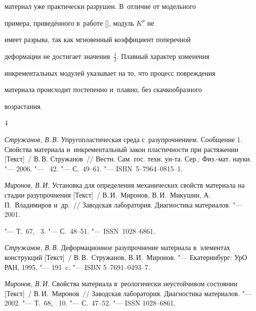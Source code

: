 материал уже практически разрушен. В~отличие от модельного

примера, приведённого в~работе [], модуль $K^{p}$ не

имеет разрыва, так как мгновенный коэффициент поперечной

деформации не достигает значения~$\frac12$. Плавный характер изменения

инкрементальных модулей указывает на то, что процесс повреждения

материала происходит постепенно и~плавно, без скачкообразного

возрастания.





\begin{thebibliography}{4}




\emph{Стружанов, В.\,В.} Упругопластическая среда с~разупрочнением. Сообщение 1. Свойства материала и~инкрементальный закон пластичности при растяжении [Текст]~/ В.\,В. Стружанов~/\!/ Вестн. Сам. гос. техн. ун-та. Сер.: Физ.-мат. науки. "--- 2006. "--- \No~42. "--- С.~49--61. "--- ISBN~5--7964--0815--1.




\emph{Миронов, В.\,И.} Установка для определения механических свойств материала на стадии разупрочнения [Текст]~/ В.\,И.~Миронов, В.\,И.~Микушин, А.\,П.~Владимиров и~др.~/\!/ Заводская лаборатория. Диагностика материалов. "--- 2001.

"--- Т.~67, \No~3. "--- С.~48--51. "--- ISSN~1028--6861.




\emph{Стружанов, В.\,В.} Деформационное разупрочнение материала в~элементах конструкций [Текст]~/ В.\,В.~Стружанов, В.\,И.~Миронов. "--- Екатеринбург: УрО РАН, 1995. "--- 191~c. "--- ISBN 5--7691--0493--7.




\emph{Миронов, В.\,И.} Свойства материала в~реологически неустойчивом состоянии [Текст]~/ В.\,И.~Миронов~/\!/ Заводская лаборатория. Диагностика материалов. "--- 2002. "--- Т.~68, \No~10. "--- С.~47--52. "--- ISSN 1028--6861.



\end{thebibliography}



\vspace{10mm}



\makeengtitle



%

